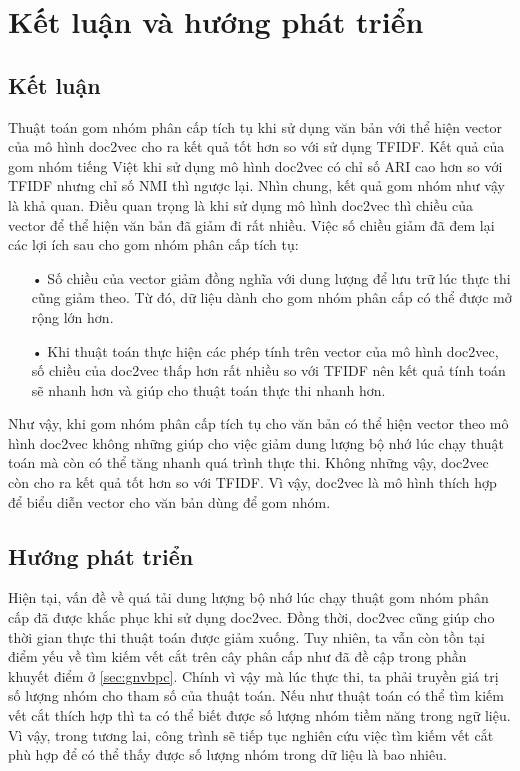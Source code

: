 \chapter{Kết luận và hướng phát triển}
\label{Chapter5}
\section{Kết luận}
Thuật toán gom nhóm phân cấp tích tụ khi sử dụng văn bản với thể hiện vector của mô hình doc2vec cho ra kết quả tốt hơn so với sử dụng TFIDF.
Kết quả của gom nhóm tiếng Việt khi sử dụng mô hình doc2vec có chỉ số ARI cao hơn so với TFIDF nhưng chỉ số NMI thì ngược lại.
Nhìn chung, kết quả gom nhóm như vậy là khả quan.
Điều quan trọng là khi sử dụng mô hình doc2vec thì chiều của vector để thể hiện văn bản đã giảm đi rất nhiều.
Việc số chiều giảm đã đem lại các lợi ích sau cho gom nhóm phân cấp tích tụ:
\begin{enumerate}
\item[•]Số chiều của vector giảm đồng nghĩa với dung lượng để lưu trữ lúc thực thi cũng giảm theo.
Từ đó, dữ liệu dành cho gom nhóm phân cấp có thể được mở rộng lớn hơn.
\item[•]Khi thuật toán thực hiện các phép tính trên vector của mô hình doc2vec, số chiều của doc2vec thấp hơn rất nhiều so với TFIDF nên kết quả tính toán sẽ nhanh hơn và giúp cho thuật toán thực thi nhanh hơn.
\end{enumerate}

Như vậy, khi gom nhóm phân cấp tích tụ cho văn bản có thể hiện vector theo mô hình doc2vec không những giúp cho việc giảm dung lượng bộ nhớ lúc chạy thuật toán mà còn có thể tăng nhanh quá trình thực thi.
Không những vậy, doc2vec còn cho ra kết quả tốt hơn so với TFIDF.
Vì vậy, doc2vec là mô hình thích hợp để biểu diễn vector cho văn bản dùng để gom nhóm.

\section{Hướng phát triển}
Hiện tại, vấn đề về quá tải dung lượng bộ nhớ lúc chạy thuật gom nhóm phân cấp đã được khắc phục khi sử dụng doc2vec.
Đồng thời, doc2vec cũng giúp cho thời gian thực thi thuật toán được giảm xuống.
Tuy nhiên, ta vẫn còn tồn tại điểm yếu về tìm kiếm vết cắt trên cây phân cấp như đã đề cập trong phần khuyết điểm ở \ref{sec:gnvbpc}.
Chính vì vậy mà lúc thực thi, ta phải truyền giá trị số lượng nhóm cho tham số của thuật toán.
Nếu như thuật toán có thể tìm kiếm vết cắt thích hợp thì ta có thể biết được số lượng nhóm tiềm năng trong ngữ liệu.
Vì vậy, trong tương lai, công trình sẽ tiếp tục nghiên cứu việc tìm kiếm vết cắt phù hợp để có thể thấy được số lượng nhóm trong dữ liệu là bao nhiêu.




